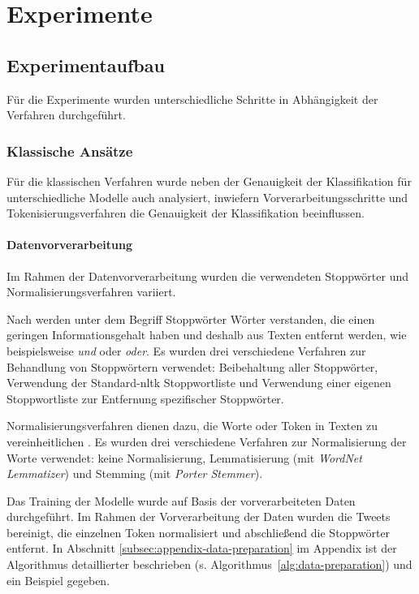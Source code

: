 \section{Experimente}

\subsection{Experimentaufbau}

Für die Experimente wurden unterschiedliche Schritte in Abhängigkeit der Verfahren durchgeführt.

\subsubsection{Klassische Ansätze}\label{subsubsec:experimente-klassische-ansaetze}

Für die klassischen Verfahren wurde neben der Genauigkeit der Klassifikation für unterschiedliche Modelle auch analysiert, inwiefern Vorverarbeitungsschritte und Tokeni\-sie\-rungs\-verfahren die Genauigkeit der Klassifikation beeinflussen.

\paragraph{Datenvorverarbeitung}
Im Rahmen der Datenvorverarbeitung wurden die verwendeten Stoppwörter und Normalisierungsverfahren variiert.

Nach \cite[S.27]{manning2009introduction} werden unter dem Begriff Stoppwörter Wörter verstanden, die einen geringen Informationsgehalt haben und deshalb aus Texten entfernt werden, wie beispielsweise \textit{und} oder \textit{oder}.
Es wurden drei verschiedene Verfahren zur Behandlung von Stoppwörtern verwendet: Beibehaltung aller Stoppwörter, Verwendung der Standard-\gls{nltk} Stoppwortliste und Verwendung einer eigenen Stoppwortliste zur Entfernung spezifischer Stoppwörter.

Normalisierungsverfahren dienen dazu, die Worte oder Token in Texten zu vereinheitlichen \cite[S.28]{manning2009introduction}.
Es wurden drei verschiedene Verfahren zur Normalisierung der Worte verwendet: keine Normalisierung, Lemmatisierung (mit \textit{WordNet Lemmatizer}) und Stemming (mit \textit{Porter Stemmer}).

Das Training der Modelle wurde auf Basis der vorverarbeiteten Daten durchgeführt.
Im Rahmen der Vorverarbeitung der Daten wurden die Tweets bereinigt, die einzelnen Token normalisiert und abschließend die Stoppwörter entfernt.
In Abschnitt \ref{subsec:appendix-data-preparation} im Appendix ist der Algorithmus detaillierter beschrieben (s. Algorithmus~\ref{alg:data-preparation}) und ein Beispiel gegeben.


